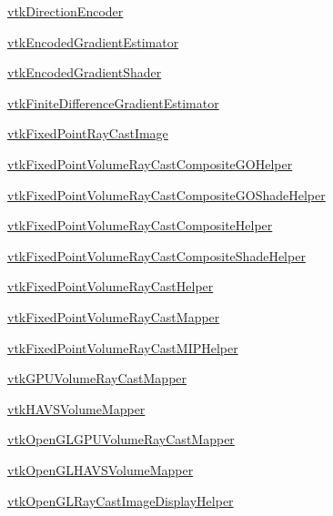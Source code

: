 
\begin{DoxyItemize}
\item \hyperlink{vtkvolumerendering_vtkdirectionencoder}{vtk\-Direction\-Encoder}  
\item \hyperlink{vtkvolumerendering_vtkencodedgradientestimator}{vtk\-Encoded\-Gradient\-Estimator}  
\item \hyperlink{vtkvolumerendering_vtkencodedgradientshader}{vtk\-Encoded\-Gradient\-Shader}  
\item \hyperlink{vtkvolumerendering_vtkfinitedifferencegradientestimator}{vtk\-Finite\-Difference\-Gradient\-Estimator}  
\item \hyperlink{vtkvolumerendering_vtkfixedpointraycastimage}{vtk\-Fixed\-Point\-Ray\-Cast\-Image}  
\item \hyperlink{vtkvolumerendering_vtkfixedpointvolumeraycastcompositegohelper}{vtk\-Fixed\-Point\-Volume\-Ray\-Cast\-Composite\-G\-O\-Helper}  
\item \hyperlink{vtkvolumerendering_vtkfixedpointvolumeraycastcompositegoshadehelper}{vtk\-Fixed\-Point\-Volume\-Ray\-Cast\-Composite\-G\-O\-Shade\-Helper}  
\item \hyperlink{vtkvolumerendering_vtkfixedpointvolumeraycastcompositehelper}{vtk\-Fixed\-Point\-Volume\-Ray\-Cast\-Composite\-Helper}  
\item \hyperlink{vtkvolumerendering_vtkfixedpointvolumeraycastcompositeshadehelper}{vtk\-Fixed\-Point\-Volume\-Ray\-Cast\-Composite\-Shade\-Helper}  
\item \hyperlink{vtkvolumerendering_vtkfixedpointvolumeraycasthelper}{vtk\-Fixed\-Point\-Volume\-Ray\-Cast\-Helper}  
\item \hyperlink{vtkvolumerendering_vtkfixedpointvolumeraycastmapper}{vtk\-Fixed\-Point\-Volume\-Ray\-Cast\-Mapper}  
\item \hyperlink{vtkvolumerendering_vtkfixedpointvolumeraycastmiphelper}{vtk\-Fixed\-Point\-Volume\-Ray\-Cast\-M\-I\-P\-Helper}  
\item \hyperlink{vtkvolumerendering_vtkgpuvolumeraycastmapper}{vtk\-G\-P\-U\-Volume\-Ray\-Cast\-Mapper}  
\item \hyperlink{vtkvolumerendering_vtkhavsvolumemapper}{vtk\-H\-A\-V\-S\-Volume\-Mapper}  
\item \hyperlink{vtkvolumerendering_vtkopenglgpuvolumeraycastmapper}{vtk\-Open\-G\-L\-G\-P\-U\-Volume\-Ray\-Cast\-Mapper}  
\item \hyperlink{vtkvolumerendering_vtkopenglhavsvolumemapper}{vtk\-Open\-G\-L\-H\-A\-V\-S\-Volume\-Mapper}  
\item \hyperlink{vtkvolumerendering_vtkopenglraycastimagedisplayhelper}{vtk\-Open\-G\-L\-Ray\-Cast\-Image\-Display\-Helper}  

\end{DoxyItemize}
